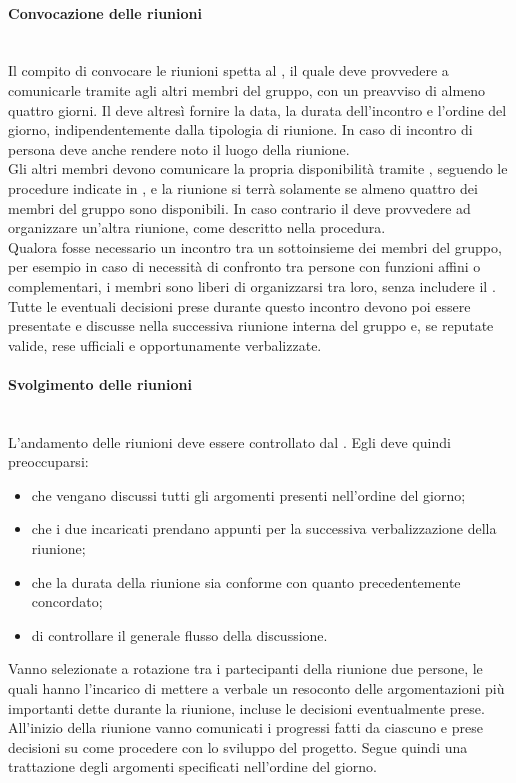 \paragraph{Convocazione delle riunioni}\mbox{}\\
Il compito di convocare le riunioni spetta al \Responsabile, il quale deve provvedere a comunicarle tramite  agli altri membri del gruppo, con un preavviso di almeno quattro giorni. Il \Responsabile{} deve altresì fornire la data, la durata dell'incontro e l'ordine del giorno, indipendentemente dalla tipologia di riunione. In caso di incontro di persona deve anche rendere noto il luogo della riunione.\\
Gli altri membri devono comunicare la propria disponibilità tramite , seguendo le procedure indicate in , e la riunione si terrà solamente se almeno quattro dei membri del gruppo sono disponibili. In caso contrario il \Responsabile{} deve provvedere ad organizzare un'altra riunione, come descritto nella procedura.\\
Qualora fosse necessario un incontro tra un sottoinsieme dei membri del gruppo, per esempio in caso di necessità di confronto tra persone con funzioni affini o complementari, i membri sono liberi di organizzarsi tra loro, senza includere il \Responsabile. Tutte le eventuali decisioni prese durante questo incontro devono poi essere presentate e discusse nella successiva riunione interna del gruppo e, se reputate valide, rese ufficiali e opportunamente verbalizzate.

\paragraph{Svolgimento delle riunioni}\label{sec:svolgimento_riunioni_interne} \mbox{}\\
L'andamento delle riunioni deve essere controllato dal \Responsabile. Egli deve quindi preoccuparsi:

\begin{itemize}
	\item che vengano discussi tutti gli argomenti presenti nell'ordine del giorno;
	\item che i due incaricati prendano appunti per la successiva verbalizzazione della riunione;
	\item che la durata della riunione sia conforme con quanto precedentemente concordato;
	\item di controllare il generale flusso della discussione.
\end{itemize}
Vanno selezionate a rotazione tra i partecipanti della riunione due persone, le quali hanno l'incarico di mettere a verbale un resoconto delle argomentazioni più importanti dette durante la riunione, incluse le decisioni eventualmente prese. All'inizio della riunione vanno comunicati i progressi fatti da ciascuno e prese decisioni su come procedere con lo sviluppo del progetto. Segue quindi una trattazione degli argomenti specificati nell'ordine del giorno. 

